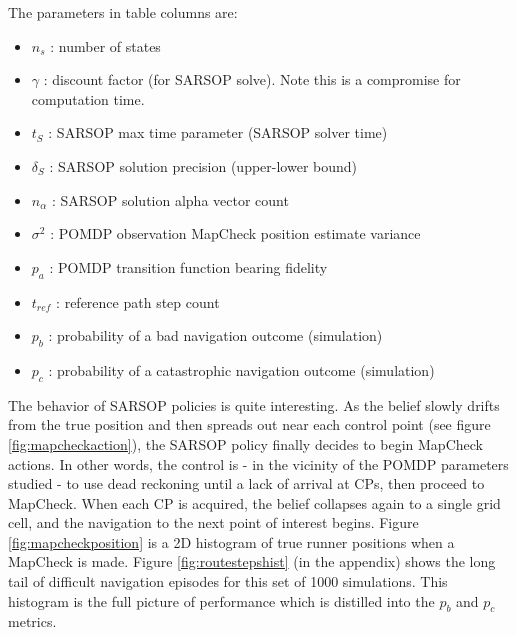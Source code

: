 \documentclass[twoside,11pt]{article}
\begin{document}
The parameters in table columns are:
\begin{itemize}[noitemsep, topsep=0pt]
\item $n_s$ : number of states
\item $\gamma$ : discount factor (for SARSOP solve). Note this is a compromise for computation time. 
\item $t_S$ : SARSOP max time parameter (SARSOP solver time)
\item $\delta_S$ : SARSOP solution precision (upper-lower bound)
\item $n_{\alpha}$ : SARSOP solution alpha vector count
\item $\sigma^2$ : POMDP observation MapCheck position estimate variance
\item $p_a$ : POMDP transition function bearing fidelity
\item $t_{ref}$ : reference path step count
\item $p_b$ : probability of a bad navigation outcome (simulation)
\item $p_c$ : probability of a catastrophic navigation outcome (simulation)
\end{itemize}

The behavior of SARSOP policies is quite interesting. As the belief slowly drifts from the true position and then spreads out near each control point (see figure \ref{fig:mapcheckaction}), the SARSOP policy finally decides to begin MapCheck actions. In other words, the control is - in the vicinity of the POMDP parameters studied - to use dead reckoning until a lack of arrival at CPs, then proceed to MapCheck. When each CP is acquired, the belief collapses again to a single grid cell, and the navigation to the next point of interest begins. Figure \ref{fig:mapcheckposition} is a 2D histogram of true runner positions when a MapCheck is made. Figure \ref{fig:routestepshist} (in the appendix) shows the long tail of difficult navigation episodes for this set of 1000 simulations. This histogram is the full picture of performance which is distilled into the $p_b$ and $p_c$ metrics.
\end{document}
